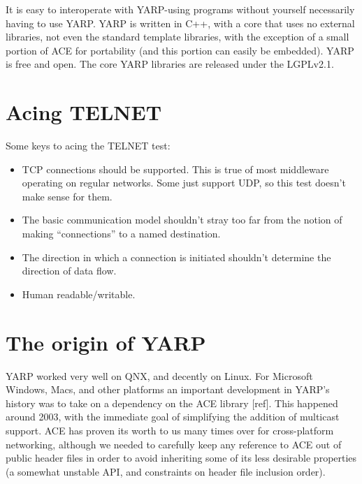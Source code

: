 It is easy to interoperate with YARP-using programs
without yourself necessarily having to use YARP. 
YARP is written in C++, with a core that uses
no external libraries, not even the standard template libraries, with
the exception of a small portion of ACE for portability (and this
portion can easily be embedded). YARP is free and open.  The
core YARP libraries are released under the LGPLv2.1.


\section{Acing TELNET}

Some keys to acing the TELNET test:

\begin{itemize}

\item TCP connections should be supported.  
  This is true of most middleware operating on regular
  networks. Some just support UDP, so this test doesn't
  make sense for them.

\item The basic communication model shouldn't stray too far from the
  notion of making ``connections'' to a named destination.

\item The direction in which a connection is initiated shouldn't
  determine the direction of data flow.

\item Human readable/writable.

\end{itemize}




\section{The origin of YARP}


YARP worked very well on QNX, and decently on Linux.  For Microsoft
Windows, Macs, and other platforms an important development in YARP's
history was to take on a dependency on the ACE library [ref].  This
happened around 2003, with the immediate goal of simplifying the
addition of multicast support.  ACE has proven its worth to us many
times over for cross-platform networking, although we needed
to carefully keep any reference to ACE out of public header files
in order to avoid inheriting some of its less desirable properties
(a somewhat unstable API, and constraints on header file inclusion
order).


